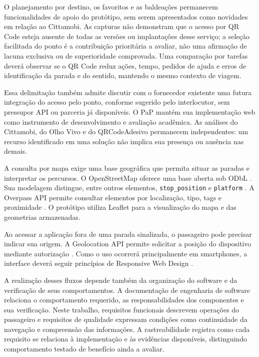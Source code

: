 \documentclass[12pt,oneside,a4paper,brazil,chapter=TITLE]{abntex2}
\begin{document}
O planejamento por destino, os favoritos e as baldeações permanecem funcionalidades de apoio do protótipo, sem serem apresentados como novidades em relação ao Cittamobi. As capturas não demonstram que o acesso por QR Code esteja ausente de todas as versões ou implantações desse serviço; a seleção facilitada do ponto é a contribuição prioritária a avaliar, não uma afirmação de lacuna exclusiva ou de superioridade comprovada. Uma comparação por tarefas deverá observar se o QR Code reduz ações, tempo, pedidos de ajuda e erros de identificação da parada e do sentido, mantendo o mesmo contexto de viagem.

Essa delimitação também admite discutir com o fornecedor existente uma futura integração do acesso pelo ponto, conforme sugerido pelo interlocutor, sem pressupor API ou parceria já disponíveis. O PaP mantém sua implementação web como instrumento de desenvolvimento e avaliação acadêmica. As análises do Cittamobi, do Olho Vivo e do QRCodeAdesivo permanecem independentes: um recurso identificado em uma solução não implica sua presença ou ausência nas demais.

A consulta por mapa exige uma base geográfica que permita situar as paradas e interpretar os percursos. O OpenStreetMap oferece uma base aberta sob ODbL \citep{osmlicense}. Sua modelagem distingue, entre outros elementos, \texttt{stop\_position} e \texttt{platform} \citep{osmpt}. A Overpass API permite consultar elementos por localização, tipo, tags e proximidade \citep{overpass}. O protótipo utiliza Leaflet para a visualização do mapa e das geometrias armazenadas.

Ao acessar a aplicação fora de uma parada sinalizada, o passageiro pode precisar indicar sua origem. A Geolocation API permite solicitar a posição do dispositivo mediante autorização \citep{geolocation}. Como o uso ocorrerá principalmente em smartphones, a interface deverá seguir princípios de Responsive Web Design \citep{responsive}.

A realização desses fluxos depende também da organização do software e da verificação de seus comportamentos. A documentação de engenharia de software relaciona o comportamento requerido, as responsabilidades dos componentes e sua verificação. Neste trabalho, requisitos funcionais descrevem operações do passageiro e requisitos de qualidade expressam condições como continuidade da navegação e compreensão das informações. A rastreabilidade registra como cada requisito se relaciona à implementação e às evidências disponíveis, distinguindo comportamento testado de benefício ainda a avaliar.
\end{document}
